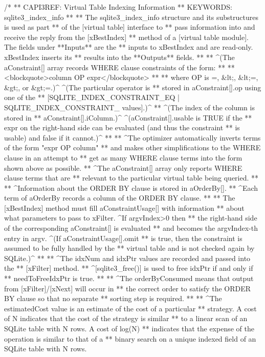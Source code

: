 \begin{Codex}[label=sqlite3.h,numbers=left]
{/*
** CAPI3REF: Virtual Table Indexing Information
** KEYWORDS: sqlite3_index_info
**
** The sqlite3_index_info structure and its substructures is used as part
** of the [virtual table] interface to
** pass information into and receive the reply from the [xBestIndex]
** method of a [virtual table module].  The fields under **Inputs** are the
** inputs to xBestIndex and are read-only.  xBestIndex inserts its
** results into the **Outputs** fields.
**
** ^(The aConstraint[] array records WHERE clause constraints of the form:
**
** <blockquote>column OP expr</blockquote>
**
** where OP is =, &lt;, &lt;=, &gt;, or &gt;=.)^  ^(The particular operator is
** stored in aConstraint[].op using one of the
** [SQLITE_INDEX_CONSTRAINT_EQ | SQLITE_INDEX_CONSTRAINT_ values].)^
** ^(The index of the column is stored in
** aConstraint[].iColumn.)^  ^(aConstraint[].usable is TRUE if the
** expr on the right-hand side can be evaluated (and thus the constraint
** is usable) and false if it cannot.)^
**
** ^The optimizer automatically inverts terms of the form "expr OP column"
** and makes other simplifications to the WHERE clause in an attempt to
** get as many WHERE clause terms into the form shown above as possible.
** ^The aConstraint[] array only reports WHERE clause terms that are
** relevant to the particular virtual table being queried.
**
** ^Information about the ORDER BY clause is stored in aOrderBy[].
** ^Each term of aOrderBy records a column of the ORDER BY clause.
**
** The [xBestIndex] method must fill aConstraintUsage[] with information
** about what parameters to pass to xFilter.  ^If argvIndex>0 then
** the right-hand side of the corresponding aConstraint[] is evaluated
** and becomes the argvIndex-th entry in argv.  ^(If aConstraintUsage[].omit
** is true, then the constraint is assumed to be fully handled by the
** virtual table and is not checked again by SQLite.)^
**
** ^The idxNum and idxPtr values are recorded and passed into the
** [xFilter] method.
** ^[sqlite3_free()] is used to free idxPtr if and only if
** needToFreeIdxPtr is true.
**
** ^The orderByConsumed means that output from [xFilter]/[xNext] will occur in
** the correct order to satisfy the ORDER BY clause so that no separate
** sorting step is required.
**
** ^The estimatedCost value is an estimate of the cost of a particular
** strategy. A cost of N indicates that the cost of the strategy is similar
** to a linear scan of an SQLite table with N rows. A cost of log(N) 
** indicates that the expense of the operation is similar to that of a
** binary search on a unique indexed field of an SQLite table with N rows.
}
\end{Codex}
